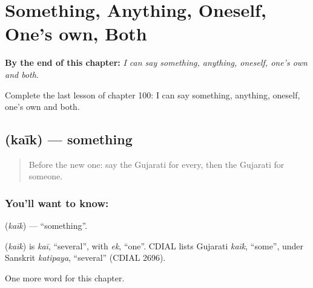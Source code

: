 
\chapter{Something, Anything, Oneself, One's own, Both}
\label{ch:gu-something-anything-oneself-one-s-own-both}

\begin{chapteropening}
\textbf{By the end of this chapter:} \emph{I can say something, anything, oneself, one's own and both.}

Complete the last lesson of chapter 100: I can say something, anything, oneself, one's own and both.
\end{chapteropening}

\section[\texorpdfstring{\gu{કંઈક} (kaīk)}{કંઈક (kaīk)}]{ (kaīk) — something}

\label{lesson:GU-C100-kaik}



\begin{quote}
Before the new one: say the Gujarati for every, then the Gujarati for someone.
\end{quote}

\subsection*{You'll want to know: }
\textbf{} (\emph{kaīk}) — \textquotedblleft{}something\textquotedblright{}.

\begin{cousinweb}
\textbf{} (\emph{kaīk}) is \emph{kaī}, \textquotedblleft{}several\textquotedblright{}, with \emph{ek}, \textquotedblleft{}one\textquotedblright{}. CDIAL lists Gujarati \emph{kaīk}, \textquotedblleft{}some\textquotedblright{}, under Sanskrit \emph{katipaya}, \textquotedblleft{}several\textquotedblright{} (CDIAL 2696).
\end{cousinweb}

\begin{grammarlens}[title={What you've built}]
One more word for this chapter.
\end{grammarlens}

